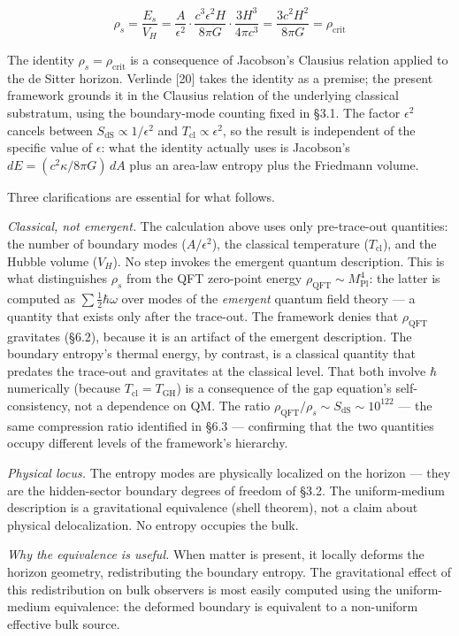 \documentclass[
]{article}
\begin{document}
\[\rho_s = \frac{E_s}{V_H} = \frac{A}{\epsilon^2} \cdot \frac{c^3 \epsilon^2 H}{8\pi G} \cdot \frac{3H^3}{4\pi c^3} = \frac{3c^2 H^2}{8\pi G} = \rho_{\text{crit}}\]

The identity \(\rho_s = \rho_{\text{crit}}\) is a consequence of
Jacobson's Clausius relation applied to the de Sitter horizon. Verlinde
{[}20{]} takes the identity as a premise; the present framework grounds
it in the Clausius relation of the underlying classical substratum,
using the boundary-mode counting fixed in §3.1. The factor
\(\epsilon^2\) cancels between \(S_{\text{dS}} \propto 1/\epsilon^2\)
and \(T_{\text{cl}} \propto \epsilon^2\), so the result is independent
of the specific value of \(\epsilon\): what the identity actually uses
is Jacobson's \(dE = (c^2\kappa/8\pi G)\,dA\) plus an area-law entropy
plus the Friedmann volume.

Three clarifications are essential for what follows.

\emph{Classical, not emergent.} The calculation above uses only
pre-trace-out quantities: the number of boundary modes
(\(A/\epsilon^2\)), the classical temperature (\(T_{\text{cl}}\)), and
the Hubble volume (\(V_H\)). No step invokes the emergent quantum
description. This is what distinguishes \(\rho_s\) from the QFT
zero-point energy \(\rho_{\text{QFT}} \sim M_{\text{Pl}}^4\): the latter
is computed as \(\sum \frac{1}{2}\hbar\omega\) over modes of the
\emph{emergent} quantum field theory --- a quantity that exists only
after the trace-out. The framework denies that \(\rho_{\text{QFT}}\)
gravitates (§6.2), because it is an artifact of the emergent
description. The boundary entropy's thermal energy, by contrast, is a
classical quantity that predates the trace-out and gravitates at the
classical level. That both involve \(\hbar\) numerically (because
\(T_{\text{cl}} = T_{\text{GH}}\)) is a consequence of the gap
equation's self-consistency, not a dependence on QM. The ratio
\(\rho_{\text{QFT}} / \rho_s \sim S_{\text{dS}} \sim 10^{122}\) --- the
same compression ratio identified in §6.3 --- confirming that the two
quantities occupy different levels of the framework's hierarchy.

\emph{Physical locus.} The entropy modes are physically localized on the
horizon --- they are the hidden-sector boundary degrees of freedom of
§3.2. The uniform-medium description is a gravitational equivalence
(shell theorem), not a claim about physical delocalization. No entropy
occupies the bulk.

\emph{Why the equivalence is useful.} When matter is present, it locally
deforms the horizon geometry, redistributing the boundary entropy. The
gravitational effect of this redistribution on bulk observers is most
easily computed using the uniform-medium equivalence: the deformed
boundary is equivalent to a non-uniform effective bulk source.
\end{document}
